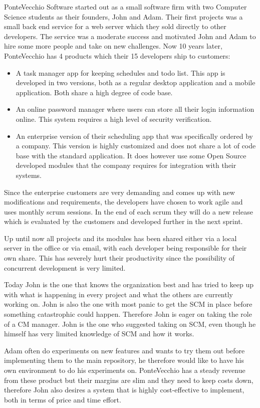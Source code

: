 \documentclass[10pt]{article}
\begin{document}
\noindent PonteVecchio Software started out as a small software firm with two Computer Science students as their founders, John and Adam. Their first projects was a small back end service for a web server which they sold directly to other developers. The service was a moderate success and motivated John and Adam to hire some more people and take on new challenges. Now 10 years later, PonteVecchio has 4 products which their 15 developers ship to customers:
\begin{itemize}
\item A task manager app for keeping schedules and todo list. This app is developed in two versions, both as a regular desktop application and a mobile application. Both share a high degree of code base. 
\item An online password manager where users can store all their login information online. This system requires a high level of security verification.
\item An enterprise version of their scheduling app that was specifically ordered by a company. This version is highly customized and does not share a lot of code base with the standard application. It does however use some Open Source developed modules that the company requires for integration with their systems. 
\end{itemize}

\noindent Since the enterprise customers are very demanding and comes up with new modifications and requirements, the developers have chosen to work agile and uses monthly scrum sessions. In the end of each scrum they will do a new release which is evaluated by the customers and developed further in the next sprint.

\noindent Up until now all projects and its modules has been shared either via a local server in the office or via email, with each developer being responsible for their own share. This has severely hurt their productivity since the possibility of concurrent development is very limited. 

\noindent Today John is the one that knows the organization best and has tried to keep up with what is happening in every project and what the others are currently working on. John is also the one with most panic to get the SCM in place before something catastrophic could happen. Therefore John is eager on taking the role of a CM manager. John is the one who suggested taking on SCM, even though he himself has very limited knowledge of SCM and how it works.

\noindent Adam often do experiments on new features and wants to try them out before implementing them to the main repository, he therefore would like to have his own environment to do his experiments on. PonteVecchio has a steady revenue from these product but their margins are slim and they need to keep costs down, therefore John also desires a system that is highly cost-effective to implement, both in terms of price and time effort. 
\end{document}
